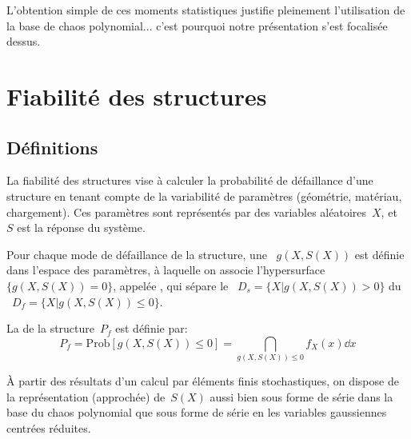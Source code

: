 \medskip
L'obtention simple de ces moments statistiques justifie pleinement l'utilisation de la base de chaos polynomial... c'est pourquoi notre présentation s'est focalisée dessus.


\medskip
\section{Fiabilité des structures}

\subsection{Définitions}

La fiabilité des structures vise à calculer la probabilité de défaillance d'une structure en tenant compte de la variabilité de paramètres (géométrie, matériau,
chargement). Ces paramètres sont représentés par des variables aléatoires~$X$, et~$S$ est la réponse du système.

Pour chaque mode de défaillance de la structure, une ~$g(X,S(X))$ est définie dans l'espace des paramètres, à laquelle on associe l'hypersurface~$\{g(X,S(X)) = 0\}$, appelée , qui sépare le ~$D_s = \{X|g(X,S(X))>0\}$ du ~$D_f =\{X|g(X,S(X))\le0\}$.

La  de la structure~$P_f$ est définie par:
\begin{equation}
P_f = \text{Prob}[g(X,S(X))\le0] = \dint_{g(X,S(X))\le0} f_X(x)\dd x
\end{equation}

\medskip
À partir des résultats d'un calcul par éléments finis stochastiques, on dispose de la représentation (approchée) de~$S(X)$ aussi bien sous forme de série dans la base du chaos polynomial que sous forme de série en les variables gaussiennes centrées réduites.

